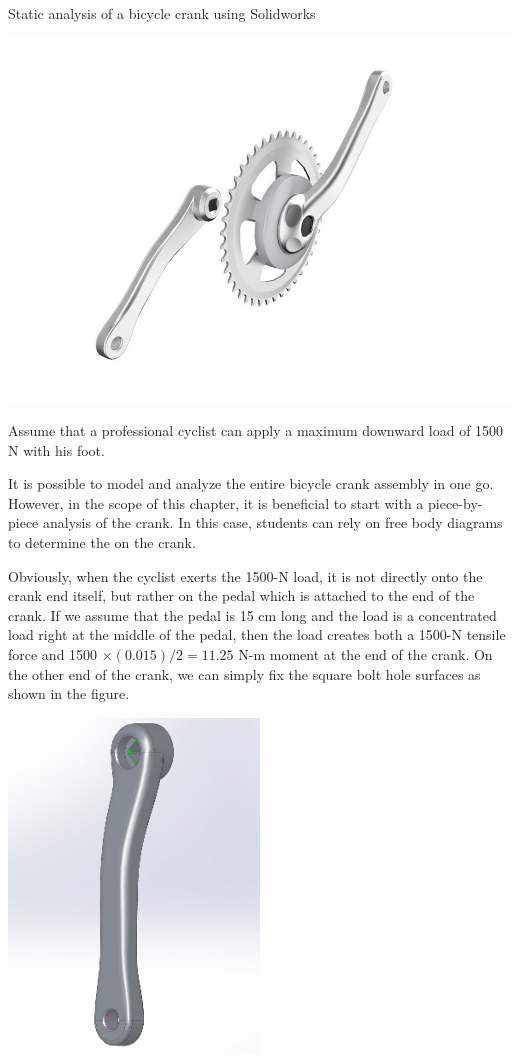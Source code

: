 \documentclass[a4paper,openany,12pt]{book}
\begin{document}
{{Static analysis of a bicycle crank using Solidworks


\begin{center}
\includegraphics[width=.9\linewidth]{pictures/Intro-CAD/bike-crank-set.jpg}
\end{center}

Assume that a professional cyclist can apply a maximum downward load of
1500 N with his foot.

It is possible to model and analyze the entire bicycle crank assembly in
one go. However, in the scope of this chapter, it is beneficial to start
with a piece-by-piece analysis of the crank. In this case, students can
rely on free body diagrams to determine the on the crank.

Obviously, when the cyclist exerts the 1500-N load, it is not directly
onto the crank end itself, but rather on the pedal which is attached to
the end of the crank. If we assume that the pedal is 15 cm long and the
load is a concentrated load right at the middle of the pedal, then the
load creates both a 1500-N tensile force and 1500
\(\times (0.015)/2 = 11.25\) N-m moment at the end of the crank. On the
other end of the crank, we can simply fix the square bolt hole surfaces
as shown in the figure.

\begin{center}
\includegraphics[width=0.5\textwidth]{pictures/Intro-CAD/Crank-before-running.png}
\end{center}

}}
\end{document}
